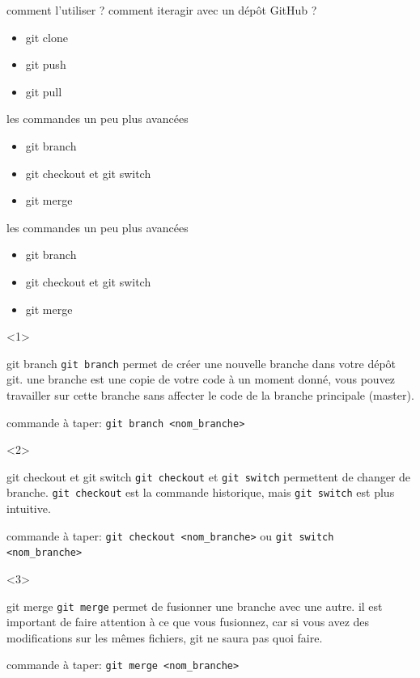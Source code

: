 \documentclass[usenames,dvipsnames]{beamer}
\begin{document}
\begin{frame}[fragile]{comment l'utiliser ?}
	comment iteragir avec un dépôt GitHub ?
	\begin{itemize}
		\item git clone
		\item git push
		\item git pull
	\end{itemize}
\end{frame}


\begin{frame}[fragile]{les commandes un peu plus avancées}
	\begin{itemize}
		\item git branch
		\item git checkout et git switch
		\item git merge
	\end{itemize}
\end{frame}

\begin{frame}[fragile]{les commandes un peu plus avancées}
	\begin{itemize}
		\item<1-3> git branch
		\item <2-3> git checkout et git switch
		\item <3-3> git merge
	\end{itemize}

	\begin{onlyenv}
		\begin{block}{git branch}
			\texttt{git branch} permet de créer une nouvelle branche dans votre dépôt git. une branche est une copie de votre code à un moment donné, vous pouvez travailler sur cette branche sans affecter le code de la branche principale (master).
		\end{block}

		commande à taper: \lstinline|git branch <nom_branche>|
	\end{onlyenv}

	\begin{onlyenv}
		\begin{block}{git checkout et git switch}
			\texttt{git checkout} et \texttt{git switch} permettent de changer de branche. \texttt{git checkout} est la commande historique, mais \texttt{git switch} est plus intuitive.
		\end{block}

		commande à taper: \lstinline|git checkout <nom_branche>| ou \lstinline|git switch <nom_branche>|
	\end{onlyenv}

	\begin{onlyenv}
		\begin{block}{git merge}
			\texttt{git merge} permet de fusionner une branche avec une autre. il est important de faire attention à ce que vous fusionnez, car si vous avez des modifications sur les mêmes fichiers, git ne saura pas quoi faire.
		\end{block}

		commande à taper: \lstinline|git merge <nom_branche>|
	\end{onlyenv}
\end{frame}
\end{document}
